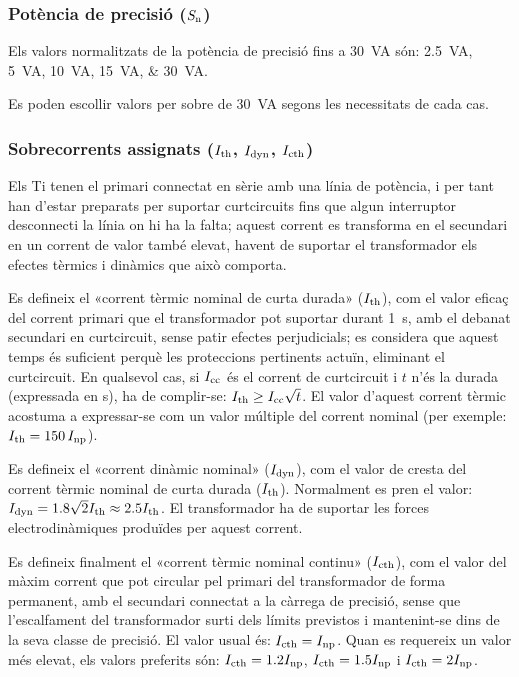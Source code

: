 \subsubsection{Potència de precisió ($S_\mathrm{n}$)}

 Els valors normalitzats de la potència de precisió fins a \SI{30}{VA}
són: \SIlist{2,5; 5;10; 15; 30}{VA}.

Es poden escollir valors per sobre de \SI{30}{VA} segons les necessitats de cada cas.

\subsubsection{Sobrecorrents  assignats ($I_\mathrm{th}$, $I_\mathrm{dyn}$, $I_\mathrm{cth}$)}

 Els Ti
tenen el primari connectat en sèrie amb una línia de potència, i per tant han
d'estar preparats per suportar curtcircuits fins que algun
interruptor desconnecti la línia on hi ha la falta; aquest
corrent es transforma en el secundari en un corrent de valor
també elevat, havent de suportar el transformador els efectes tèrmics
i dinàmics que això comporta.

Es defineix el «corrent tèrmic nominal de curta durada»
($I_\mathrm{th}$), com el valor eficaç del  corrent primari que el
transformador pot suportar durant \SI{1}{s}, amb el debanat
secundari en curtcircuit, sense patir efectes perjudicials; es
considera que aquest temps és suficient perquè les proteccions
pertinents actuïn, eliminant el curtcircuit. En qualsevol cas, si
$I_\mathrm{cc}$ és el corrent de curtcircuit i $t$ n'és la durada
(expressada en s), ha de complir-se: $I_\mathrm{th}\geq
I_\mathrm{cc}\sqrt{t}$. El valor d'aquest corrent tèrmic
acostuma a expressar-se com  un valor múltiple del corrent
nominal (per exemple: $I_\mathrm{th}=150\,I_\mathrm{np}$).

Es defineix el «corrent dinàmic nominal» ($I_\mathrm{dyn}$), com el
valor de cresta del corrent tèrmic nominal de curta durada ($I_\mathrm{th}$).
Normalment es pren el valor: $I_\mathrm{dyn} =
\num{1,8}\sqrt{2}I_\mathrm{th}\approx \num{2,5}I_\mathrm{th}$. El transformador ha de
suportar les forces electrodinàmiques produïdes per aquest corrent.

Es defineix finalment el «corrent tèrmic nominal continu» ($I_\mathrm{cth}$), com
el valor del màxim corrent que pot circular pel primari del
transformador  de forma permanent, amb el secundari connectat a la
càrrega de precisió, sense que l'escalfament del transformador surti
dels límits previstos i mantenint-se dins de la
seva classe de precisió. El valor usual és: $I_\mathrm{cth} = I_\mathrm{np}$. Quan es requereix un valor més elevat, els valors preferits són:
$I_\mathrm{cth} = \num{1,2}I_\mathrm{np}$, $I_\mathrm{cth} = \num{1,5}I_\mathrm{np}$ i $I_\mathrm{cth} = 2 I_\mathrm{np}$.


